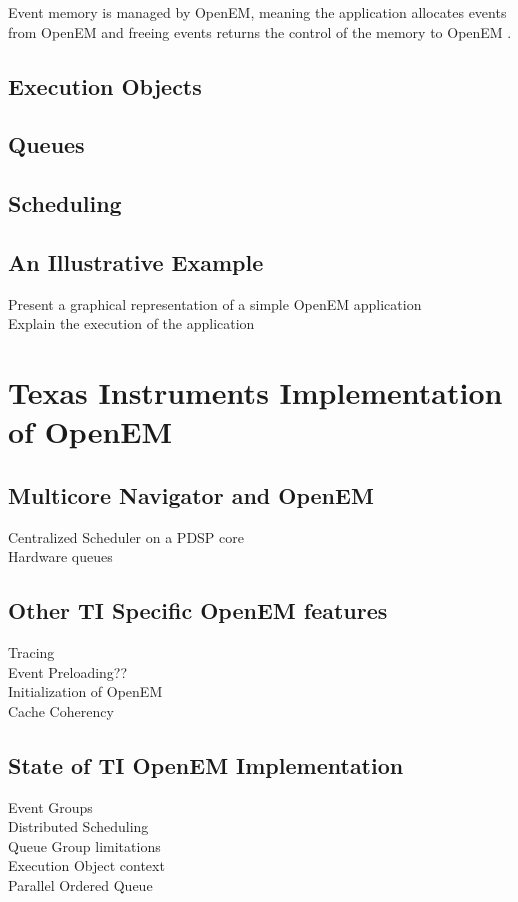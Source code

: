 Event memory is managed by OpenEM, meaning the application allocates events
from OpenEM and freeing events returns the control of the memory to OpenEM
\cite{openemintro}.
\subsection{Execution Objects}
\label{subsec:eos}
\subsection{Queues}
\label{subsec:queues}
\subsection{Scheduling}
\label{subsec:schedule}
\subsection{An Illustrative Example}
\label{subsec:example}
Present a graphical representation of a simple OpenEM application\\
Explain the execution of the application

\section{Texas Instruments Implementation of OpenEM}
\subsection{Multicore Navigator and OpenEM}
Centralized Scheduler on a PDSP core\\
Hardware queues\\
\subsection{Other TI Specific OpenEM features}
Tracing\\
Event Preloading??\\
Initialization of OpenEM\\
Cache Coherency
\subsection{State of TI OpenEM Implementation}
Event Groups\\
Distributed Scheduling\\
Queue Group limitations\\
Execution Object context\\
Parallel Ordered Queue\\


